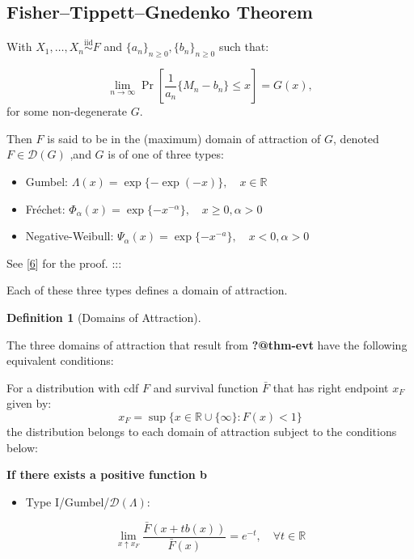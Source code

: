 \documentclass[
  10pt,
  a4paper,
]{scrreprt}
\providecommand{\tightlist}{%
  \setlength{\itemsep}{0pt}\setlength{\parskip}{0pt}}\usepackage{longtable,booktabs,array}
\theoremstyle{plain}
\theoremstyle{definition}
\newtheorem{definition}{Definition}[section]
\theoremstyle{plain}
\theoremstyle{remark}
\begin{document}
{\hypertarget{fishertippettgnedenko-theorem}{%
\subsection{Fisher--Tippett--Gnedenko
Theorem}\label{fishertippettgnedenko-theorem}}

With \(X_1, \ldots,X_n \overset{\mathrm{iid}}{\sim} F\) and
\(\{ a_n\}_{n\ge0}, \{ b_n\}_{n\ge0}\) such that:

\[\lim_{n\rightarrow\infty}\Pr\left[\displaystyle\frac{1}{a_n}\{M_n-b_n\}\le x\right] = G(x),\]
for some non-degenerate \(G\).

Then \(F\) is said to be in the (maximum) domain of attraction of \(G\),
denoted \(F\in\mathcal D(G)\) ,and \(G\) is of one of three types:

\begin{itemize}
\tightlist
\item
  Gumbel: \(\Lambda(x) = \exp\{-\exp(-x)\},\quad x \in \mathbb R\)
\item
  Fréchet:
  \(\Phi_\alpha(x) = \exp\{-x^{-\alpha}\},\quad x\ge 0,\alpha>0\)
\item
  Negative-Weibull:
  \(\Psi_\alpha(x) = \exp\{-x^{-a}\},\quad x<0,\alpha>0\)
\end{itemize}

See {[}\protect\hyperlink{ref-haan06}{6}{]} for the proof. :::

Each of these three types defines a domain of attraction.

\begin{definition}[Domains of
Attraction]\protect\hypertarget{def-doa}{}\label{def-doa}

The three domains of attraction that result from \textbf{?@thm-evt} have
the following equivalent conditions:

For a distribution with cdf \(F\) and survival function \(\bar F\) that
has right endpoint \(x_F\) given by: \[
x_F = \sup\{x \in \mathbb R \cup\{\infty\}:F(x)<1\}
\] the distribution belongs to each domain of attraction subject to the
conditions below:

\textbf{If there exists a positive function b}

\begin{itemize}
\tightlist
\item
  Type I/Gumbel/\(\mathcal D(\Lambda)\):
\end{itemize}

\[
\lim_{x\uparrow x_F} \displaystyle\frac{\bar F(x+tb(x))}{\bar F(x)} = e^{-t},\quad \forall t\in\mathbb R
\]


\end{definition}}
\end{document}
